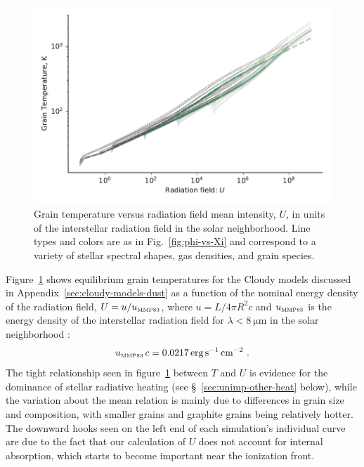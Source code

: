 \begin{figure}
  \centering
  \includegraphics[width=\linewidth]{figs/grain-T-vs-U}
  \caption{Grain temperature versus radiation field mean intensity,
    \(U\), in units of the interstellar radiation field in the solar
    neighborhood.  Line types and colors are as in
    Fig.~\ref{fig:phi-vs-Xi} and correspond to a variety of stellar
    spectral shapes, gas densities, and grain species.}
  \label{fig:grain-T-vs-U}
\end{figure}

Figure~\ref{fig:grain-T-vs-U} shows equilibrium grain temperatures for
the Cloudy models discussed in Appendix~\ref{sec:cloudy-models-dust}
as a function of the nominal energy density of the radiation field,
\(U = u / u_{\text{\tiny MMP83}} \), where \(u = L / 4 \pi R^2 c\) and \(u_{\text{\tiny MMP83}}\) is the
energy density of the interstellar radiation field for
\(\lambda < \SI{8}{\um}\) in the solar neighborhood
\citep{Mathis:1983a}:
\begin{equation}
  \label{eq:u-mmp83}
  u_{\text{\tiny MMP83}}\,c = \SI{0.0217}{erg.s^{-1}.cm^{-2}} \ .
\end{equation}
The tight relationship seen in figure~\ref{fig:grain-T-vs-U} between
\(T\) and \(U\) is evidence for the dominance of stellar radiative
heating (see \S~\ref{sec:unimp-other-heat} below), while the variation
about the mean relation is mainly due to differences in grain size and
composition, with smaller grains and graphite grains being relatively
hotter.  The downward hooks seen on the left end of each simulation's
individual curve are due to the fact that our calculation of \(U\)
does not account for internal absorption, which starts to become
important near the ionization front.

